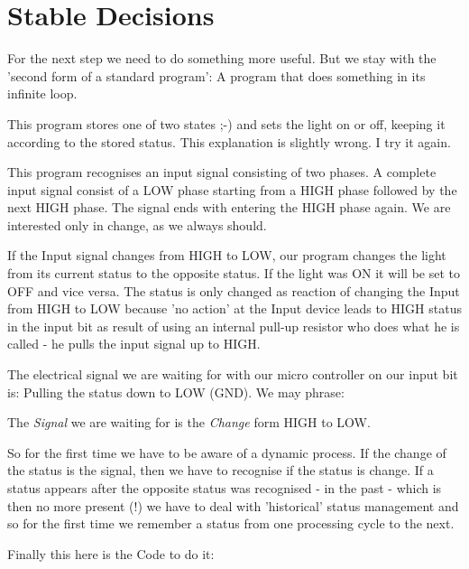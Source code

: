 \section{Stable Decisions}

For the next step we need to do something more useful. But we stay with the 'second form of a standard program': A program that does something in its infinite loop.

This program stores one of two states ;-) and sets the light on or off, keeping it according to the stored status. This explanation is slightly wrong. I try it again.

This program recognises an input signal consisting of two phases. A complete input signal consist of a LOW phase starting from a HIGH phase followed by the next HIGH phase. The signal ends with entering the HIGH phase again. We are interested only in change, as we always should.

If the Input signal changes from HIGH to LOW, our program changes the light from its current status to the opposite status. If the light was ON it will be set to OFF and vice versa. The status is only changed as reaction of changing the Input from HIGH to LOW because 'no action' at the Input device leads to HIGH status in the input bit as result of using an internal pull-up resistor who does what he is called - he pulls the input signal up to HIGH.

The electrical signal we are waiting for with our micro controller on our input bit is: Pulling the status down to LOW (GND). We may phrase:

\begin{center}
The \emph{Signal} we are waiting for is the \emph{Change} form HIGH to LOW.
\end{center}


So for the first time we have to be aware of a dynamic process. If the change of the status is the signal, then we have to recognise if the status is change. If a status appears after the opposite status was recognised - in the past - which is then no more present (!) we have to deal with 'historical' status management and so for the first time we remember a status from one processing cycle to the next.

Finally this here is the Code to do it:

